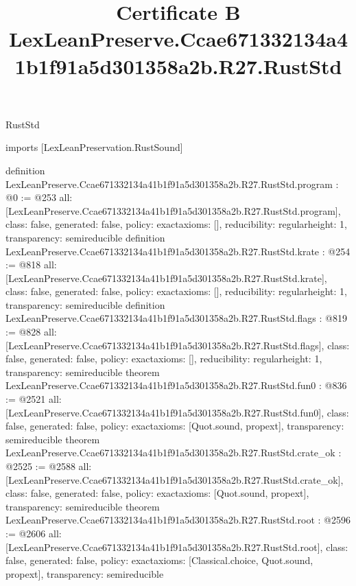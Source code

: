 \begin{lexlean}{RustStd}
\title{Certificate B LexLeanPreserve.Ccae671332134a41b1f91a5d301358a2b.R27.RustStd}
\begin{coremodule}
imports [LexLeanPreservation.RustSound]

definition LexLeanPreserve.Ccae671332134a41b1f91a5d301358a2b.R27.RustStd.program : @0 := @253 {
  all: [LexLeanPreserve.Ccae671332134a41b1f91a5d301358a2b.R27.RustStd.program],
  class: false,
  generated: false,
  policy: exact{axioms: []},
  reducibility: regular{height: 1},
  transparency: semireducible
}
definition LexLeanPreserve.Ccae671332134a41b1f91a5d301358a2b.R27.RustStd.krate : @254 := @818 {
  all: [LexLeanPreserve.Ccae671332134a41b1f91a5d301358a2b.R27.RustStd.krate],
  class: false,
  generated: false,
  policy: exact{axioms: []},
  reducibility: regular{height: 1},
  transparency: semireducible
}
definition LexLeanPreserve.Ccae671332134a41b1f91a5d301358a2b.R27.RustStd.flags : @819 := @828 {
  all: [LexLeanPreserve.Ccae671332134a41b1f91a5d301358a2b.R27.RustStd.flags],
  class: false,
  generated: false,
  policy: exact{axioms: []},
  reducibility: regular{height: 1},
  transparency: semireducible
}
theorem LexLeanPreserve.Ccae671332134a41b1f91a5d301358a2b.R27.RustStd.fun0 : @836 := @2521 {
  all: [LexLeanPreserve.Ccae671332134a41b1f91a5d301358a2b.R27.RustStd.fun0],
  class: false,
  generated: false,
  policy: exact{axioms: [Quot.sound, propext]},
  transparency: semireducible
}
theorem LexLeanPreserve.Ccae671332134a41b1f91a5d301358a2b.R27.RustStd.crate_ok : @2525 := @2588 {
  all: [LexLeanPreserve.Ccae671332134a41b1f91a5d301358a2b.R27.RustStd.crate_ok],
  class: false,
  generated: false,
  policy: exact{axioms: [Quot.sound, propext]},
  transparency: semireducible
}
theorem LexLeanPreserve.Ccae671332134a41b1f91a5d301358a2b.R27.RustStd.root : @2596 := @2606 {
  all: [LexLeanPreserve.Ccae671332134a41b1f91a5d301358a2b.R27.RustStd.root],
  class: false,
  generated: false,
  policy: exact{axioms: [Classical.choice, Quot.sound, propext]},
  transparency: semireducible
}


\end{coremodule}
\end{lexlean}
